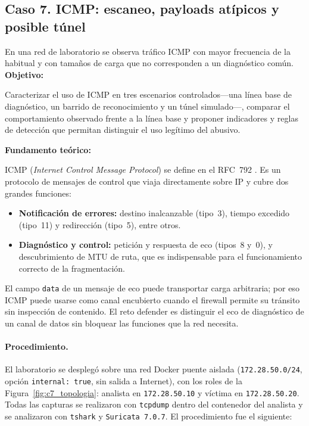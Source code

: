 \subsection{Caso 7. ICMP: escaneo, payloads atípicos y posible túnel}
\label{caso:icmp}

\begin{situacion}
En una red de laboratorio se observa tráfico ICMP con mayor frecuencia de la habitual y con tamaños de carga que no corresponden a un diagnóstico común.
\textbf{Objetivo:} \par
Caracterizar el uso de ICMP en tres escenarios controlados---una línea base de diagnóstico, un barrido de reconocimiento y un túnel simulado---, comparar el comportamiento observado frente a la línea base y proponer indicadores y reglas de detección que permitan distinguir el uso legítimo del abusivo. \par
\textbf{Fundamento teórico:} \par
ICMP (\textit{Internet Control Message Protocol}) se define en el RFC~792 \parencite{rfc792}. Es un protocolo de mensajes de control que viaja directamente sobre IP y cubre dos grandes funciones:
\begin{itemize}
	\item \textbf{Notificación de errores:} destino inalcanzable (tipo~3), tiempo excedido (tipo~11) y redirección (tipo~5), entre otros.
	\item \textbf{Diagnóstico y control:} petición y respuesta de eco (tipos~8 y~0), y descubrimiento de MTU de ruta, que es indispensable para el funcionamiento correcto de la fragmentación.
\end{itemize}
El campo \texttt{data} de un mensaje de eco puede transportar carga arbitraria; por eso ICMP puede usarse como canal encubierto cuando el firewall permite su tránsito sin inspección de contenido. El reto defender es distinguir el eco de diagnóstico de un canal de datos sin bloquear las funciones que la red necesita.
\end{situacion}

\paragraph{Procedimiento.}
El laboratorio se desplegó sobre una red Docker puente aislada (\texttt{172.28.50.0/24}, opción \texttt{internal: true}, sin salida a Internet), con los roles de la Figura~\ref{fig:c7_topologia}: analista en \texttt{172.28.50.10} y víctima en \texttt{172.28.50.20}. Todas las capturas se realizaron con \texttt{tcpdump} dentro del contenedor del analista y se analizaron con \texttt{tshark} y \texttt{Suricata 7.0.7}. El procedimiento fue el siguiente:

